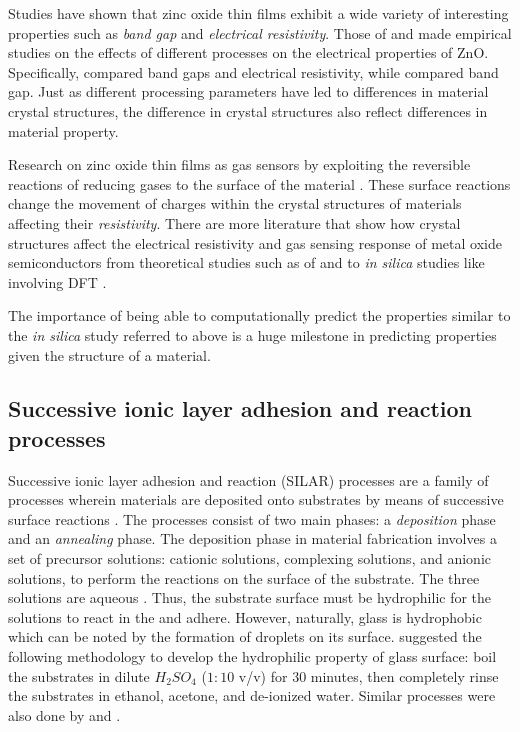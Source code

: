 Studies have shown that zinc oxide thin films exhibit a wide variety of interesting properties such as  \emph{band gap} and \emph{electrical resistivity}.
Those of  and  made empirical studies on the effects of different processes on the electrical properties of ZnO.
Specifically,  compared band gaps and electrical resistivity, while  compared band gap.
Just as different processing parameters have led to differences in material crystal structures, the difference in crystal structures also reflect differences in material property.

Research on zinc oxide thin films as gas sensors by exploiting the reversible reactions of reducing gases to the surface of the material \cite{florido17}.
These surface reactions change the movement of charges within the crystal structures of materials affecting their \emph{resistivity}.
There are more literature that show how crystal structures affect the electrical resistivity and gas sensing response of metal oxide semiconductors from theoretical studies such as of  and  to \textit{in silica} studies like involving DFT \cite{dft}.

The importance of being able to computationally predict the properties similar to the \textit{in silica} study referred to above is a huge milestone in predicting properties given the structure of a material.

\subsection{Successive ionic layer adhesion and reaction processes}

Successive ionic layer adhesion and reaction (SILAR) processes are a family of processes wherein materials are deposited onto substrates by means of successive surface reactions \cite{gao08}.
The processes consist of two main phases: a \emph{deposition} phase and an \emph{annealing} phase.
The deposition phase in material fabrication involves a set of precursor solutions: cationic solutions, complexing solutions, and anionic solutions, to perform the reactions on the surface of the substrate.
The three solutions are aqueous \cite{gao08}.
Thus, the substrate surface must be hydrophilic for the solutions to react in the and adhere.
However, naturally, glass is hydrophobic which can be noted by the formation of droplets on its surface.
 suggested the following methodology to develop the hydrophilic property of glass surface: boil the substrates in dilute $H_2SO_4$ ($1:10$ v/v) for $30$ minutes, then completely rinse the substrates in ethanol, acetone, and de-ionized water.
Similar processes were also done by  and .

